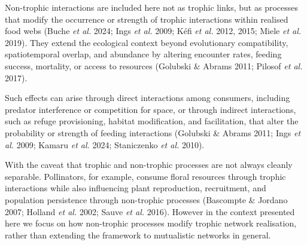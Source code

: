 \documentclass[
]{article}
\begin{document}
Non-trophic interactions are included here not as trophic links, but as
processes that modify the occurrence or strength of trophic interactions
within realised food webs (Buche \emph{et al.} 2024; Ings \emph{et al.}
2009; Kéfi \emph{et al.} 2012, 2015; Miele \emph{et al.} 2019). They
extend the ecological context beyond evolutionary compatibility,
spatiotemporal overlap, and abundance by altering encounter rates,
feeding success, mortality, or access to resources (Golubski \& Abrams
2011; Pilosof \emph{et al.} 2017).

Such effects can arise through direct interactions among consumers,
including predator interference or competition for space, or through
indirect interactions, such as refuge provisioning, habitat
modification, and facilitation, that alter the probability or strength
of feeding interactions (Golubski \& Abrams 2011; Ings \emph{et al.}
2009; Kamaru \emph{et al.} 2024; Staniczenko \emph{et al.} 2010).

With the caveat that trophic and non-trophic processes are not always
cleanly separable. Pollinators, for example, consume floral resources
through trophic interactions while also influencing plant reproduction,
recruitment, and population persistence through non-trophic processes
(Bascompte \& Jordano 2007; Holland \emph{et al.} 2002; Sauve \emph{et
al.} 2016). However in the context presented here we focus on how
non-trophic processes modify trophic network realisation, rather than
extending the framework to mutualistic networks in general.
\end{document}
